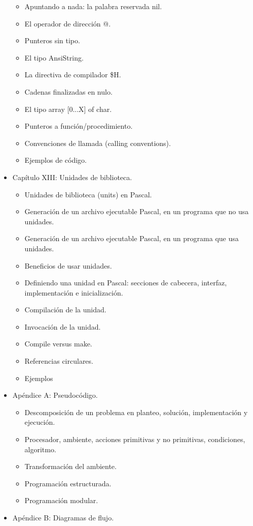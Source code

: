 \documentclass{article}
\begin{document}
\begin{itemize}
\begin{itemize}
	\item Apuntando a nada: la palabra reservada nil.
	\item El operador de dirección @.
	\item Punteros sin tipo.
	\item El tipo AnsiString.
	\item La directiva de compilador \$H.
	\item Cadenas finalizadas en nulo.
	\item El tipo array [0...X] of char.
	\item Punteros a función/procedimiento.
	\item Convenciones de llamada (calling conventions).
	\item Ejemplos de código.
	\end{itemize}
\item Capítulo XIII: Unidades de biblioteca.
	\begin{itemize}
	\item Unidades de biblioteca (units) en Pascal.
	\item Generación de un archivo ejecutable Pascal, en un programa que no usa unidades.
	\item Generación de un archivo ejecutable Pascal, en un programa que usa unidades.
	\item Beneficios de usar unidades.
	\item Definiendo una unidad en Pascal: secciones de cabecera, interfaz, implementación e inicialización.
	\item Compilación de la unidad.
	\item Invocación de la unidad.
	\item Compile versus make.
	\item Referencias circulares.
	\item Ejemplos 
	\end{itemize}
\item Apéndice A: Pseudocódigo.
	\begin{itemize}
	\item Descomposición de un problema en planteo, solución, implementación y ejecución.
	\item Procesador, ambiente, acciones primitivas y no primitivas, condiciones, algoritmo.
	\item Transformación del ambiente.
	\item Programación estructurada.
	\item Programación modular.
	\end{itemize}
\item Apéndice B: Diagramas de flujo.
\end{itemize}
 
\end{document}
